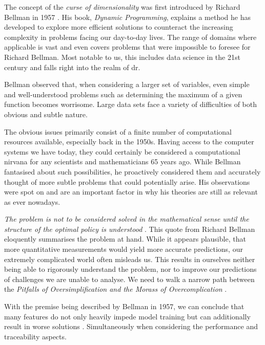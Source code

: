 The concept of the \emph{curse of dimensionality} was first introduced by Richard Bellman in 1957 \cite{DynProg}.
His book, \emph{Dynamic Programming}, explains a method he has developed to explore more efficient solutions to counteract the increasing complexity in problems facing our day-to-day lives. 
The range of domains where applicable is vast and even covers problems that were impossible to foresee for Richard Bellman.
Most notable to us, this includes data science in the 21st century and falls right into the realm of \acrlong{dr}.
\bigskip

Bellman observed that, when considering a larger set of variables, even simple and well-understood problems such as determining the maximum of a given function becomes worrisome.
Large data sets face a variety of difficulties of both obvious and subtle nature.

The obvious issues primarily consist of a finite number of computational resources available, especially back in the 1950s. 
Having access to the computer systems we have today, they could certainly be considered a computational nirvana for any scientists and mathematicians 65 years ago.
While Bellman fantasised about such possibilities, he proactively considered them and accurately thought of more subtle problems that could potentially arise.
His observations were spot on and are an important factor in why his theories are still as relevant as ever nowadays.

\emph{The problem is not to be considered solved in the mathematical sense until the structure of the optimal policy is understood} \cite{DynProg}.
This quote from Richard Bellman eloquently summarises the problem at hand.  
While it appears plausible, that more quantitative measurements would yield more accurate predictions, our extremely complicated world often misleads us.
This results in ourselves neither being able to rigorously understand the problem, nor to improve our predictions of challenges we are unable to analyse.
We need to walk a narrow path between the \emph{Pitfalls of Oversimplification and the Morass of Overcomplication} .
\bigskip

With the premise being described by Bellman in 1957, we can conclude that many features do not only heavily impede model training but can additionally result in worse solutions \cite{HandsOnMLCh8}.
Simultaneously when considering the performance and traceability aspects.
